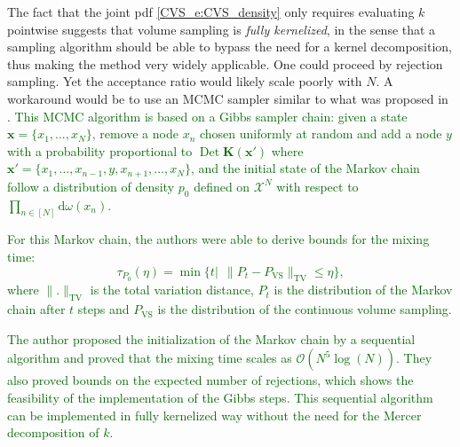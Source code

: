\documentclass[twoside,11pt]{book}
\newcommand{\rev}[1]{\textcolor{darkgreen}{#1}}
\newtheorem{theorem}{Theorem}
\numberwithin{theorem}{chapter}
\numberwithin{definition}{chapter}
\numberwithin{proposition}{chapter}
\numberwithin{corollary}{chapter}
\numberwithin{example}{chapter}
\numberwithin{lemma}{chapter}
\DeclareMathOperator{\Det}{Det}
\begin{document}
The fact that the joint pdf \eqref{CVS_e:CVS_density} only requires evaluating $k$ pointwise suggests that volume sampling is \emph{fully kernelized}, in the sense that a sampling algorithm should be able to bypass the need for a kernel decomposition, thus making the method very widely applicable.
One could proceed by rejection sampling. Yet the acceptance ratio would likely scale poorly with $N$.  A workaround would be to use an MCMC sampler similar to what was proposed in \citep{ReGh19}.
\rev{
This MCMC algorithm is based on a Gibbs sampler chain: given a state $\bm{x} = \{x_{1}, \dots , x_{N} \}$, remove a node $x_{n}$ chosen uniformly at random and add a node $y$ with a probability proportional to $\Det \bm{K}(\bm{x}')$ where $\bm{x}' = \{x_{1}, \dots, x_{n-1}, y,x_{n+1}, \dots, x_{N} \}$, and the initial state of the Markov chain follow a distribution of density $p_{0}$ defined on $\mathcal{X}^{N}$ with respect to $\prod\limits_{n \in [N]} \mathrm{d}\omega(x_{n})$. }

\rev{For this Markov chain, the authors were able to derive bounds for the mixing time:
$$\tau_{P_{0}}(\eta) = \min \{t |\:\: \|P_{t} - P_{\mathrm{VS}}\|_{\mathrm{TV}} \leq \eta \},$$ where $\|.\|_{\mathrm{TV}}$ is the total variation distance, $P_{t}$ is the distribution of the Markov chain after $t$ steps and $P_{\mathrm{VS}}$ is the distribution of the continuous volume sampling. }



\rev{ The author proposed the initialization of the Markov chain by a sequential algorithm and proved that the mixing time scales as $\mathcal{O}(N^{5}\log(N))$.
They also proved bounds on the expected number of rejections, which shows the feasibility of the implementation of the Gibbs steps.
  This sequential algorithm can be implemented in fully kernelized way without the need for the Mercer decomposition of $k$.}
\end{document}

